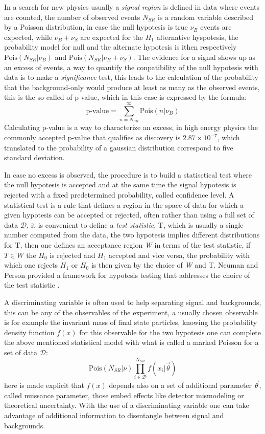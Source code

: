 In a search for new physics usually a \emph{signal region} is defined in data where 
events are counted,  the number of observed events $N_{SR}$ is a random
variable described by a Poisson distribution, in case the null hypotesis is true $\nu_{B}$ events are expected, while   
$\nu_{B} + \nu_{S}$ are expected for the $H_{1}$ alternative hyspotesis, 
the probability model for null and the alternate hypotesis is ithen respectively 
$\text{Pois}(N_{SR}|\nu_{B})$ and $\text{Pois}(N_{SR}|\nu_{B} + \nu_{S})$.
The evidence for a signal shows up as an excess of 
events, a way to quantify the conpatibility of the null hypotesis with data
is to make a \emph{significance} test, this leads to the calculation of the probability that 
the background-only would produce at least as many
as the observed events, this is the so called of p-value, which in this case is expressed by the formula:
$$
\text{p-value} = \sum_{n=N_{SR}}^{\infty} \text{Pois}(n|\nu_{B})
$$
Calculating  p-value is a way to characterize an excess, in high energy physics the commonly accepted p-value that 
qualifies as discovery is $2.87 \times 10^{-7}$, which translated to the probability of a gaussian 
distribution correspond to five standard deviation. 

In case no excess is observed, the procedure is to build a statisctical test where the 
null hypotesis is accepted and at the same time the signal hypotesis
is rejected with a fixed predetermined probability, called confidence level.
A statistical test is a rule that defines a region in the space of data for which
a given hypotesis can be accepted or rejected, often rather than using a full set 
of data $\mathcal{D}$, it is convenient to define a \emph{test statistic}, T, which is usually a single
number computed from the data, the two hypotesis implies different distributions for T, 
then one defines an acceptance region \emph{W} in terms of the test statistic, if 
$T \in W$ the $H_{0}$ is rejected and $H_{1}$ accepted and vice versa,
the probability with which one rejects $H_{1}$ or $H_{0}$ is then given by the choice of
\emph{W} and T. Neuman and Person provided a framework for hypotesis testing that addresses the 
choice of the test statistic \cite{NP}.

A discriminating variable is often used to help separating signal and backgrounds, this can be any of the observables of
the experiment, a usually chosen observable is for example the invariant mass of final state particles, 
knowing the probability density function $f(x)$ for this observable for the two hypotesis one can complete the above
mentioned statistical model with what is called a marked Poisson for a set of data $\mathcal{D}$:
$$
\text{Pois}(N_{SR}|\nu) \prod_{i \in \mathcal{D}}^{N_{SR}} f(x_{i} | \vec{\theta})
$$
here is made explicit that $f(x)$ depends also on a set of additional parameter $\vec{\theta}$, called nuissance
parameter, those embed effects like detector mismodeling or theoretical uncertainty.
With the use of a discriminating variable one can take advantage of additional information  
to disentangle between signal and backgrounds.

